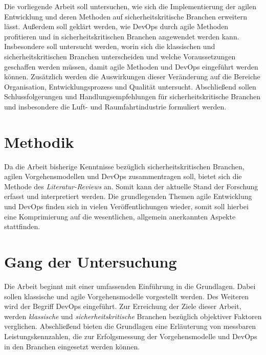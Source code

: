 Die vorliegende Arbeit soll untersuchen, wie sich die Implementierung der agilen Entwicklung und deren Methoden auf sicherheitskritische Branchen erweitern lässt.
Außerdem soll geklärt werden, wie DevOps durch agile Methoden profitieren und in sicherheitskritischen Branchen angewendet werden kann.
Insbesondere soll untersucht werden, worin sich die klassischen und sicherheitskritischen Branchen unterscheiden und welche Voraussetzungen geschaffen werden müssen, damit agile Methoden und DevOps eingeführt werden können.
Zusätzlich werden die Auswirkungen dieser Veränderung auf die Bereiche Organisation, Entwicklungsprozess und Qualität untersucht.
Abschließend sollen Schlussfolgerungen und Handlungsempfehlungen für sicherheitskritische Branchen und insbesondere die Luft- und Raumfahrtindustrie formuliert werden.


\section{Methodik}

Da die Arbeit bisherige Kenntnisse bezüglich sicherheitskritischen Branchen, agilen Vorgehensmodellen und DevOps zusammentragen soll, bietet sich die Methode des \emph{Literatur-Reviews} \parencite[vgl.][]{Fettke:2006aa} an.
Somit kann der aktuelle Stand der Forschung erfasst und interpretiert werden.
Die grundlegenden Themen agile Entwicklung und DevOps finden sich in vielen Veröffentlichungen wieder, somit soll hierbei eine Komprimierung auf die wesentlichen, allgemein anerkannten Aspekte stattfinden.

\section{Gang der Untersuchung}

Die Arbeit beginnt mit einer umfassenden Einführung in die Grundlagen.
Dabei sollen klassische und agile Vorgehensmodelle vorgestellt werden.
Des Weiteren wird der Begriff DevOps eingeführt.
Zur Erreichung der Ziele dieser Arbeit, werden \emph{klassische} und \emph{sicherheitskritische} Branchen bezüglich objektiver Faktoren verglichen.
Abschließend bieten die Grundlagen eine Erläuterung von messbaren Leistungskennzahlen, die zur Erfolgsmessung der Vorgehensmodelle und DevOps in den Branchen eingesetzt werden können.

